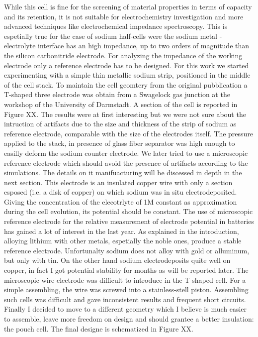 While this cell is fine for the screening of material properties in terms of capacity and its retention, it is not suitable for electrochemistry investigation and more advanced techniques like electrochemical impedance spectroscopy. This is espetially true for the case of sodium half-cells were the sodium metal -  electrolyte interface has an high impedance, up to two orders of magnitude than the silicon carbonitride electrode. For analyzing the impedance of the working electrode only a reference electrode has to be designed. For this work we started experimenting with a simple thin metallic sodium strip, positioned in the middle of the cell stack. To maintain the cell geomtery from the original pubblication a T-shaped three electrode was obtain from a Swagelock gas junction at the workshop of the University of Darmstadt. A section of the cell is reported in Figure XX. The results were at first interesting but we were not sure about the intruction of artifacts due to the size and thickness of the strip of sodium as reference electrode, comparable with the size of the electrodes itself. The pressure applied to the stack, in presence of glass fiber separator was high enough to easilly deform the sodium counter electrode. We later tried to use a microscopic reference electrode which should avoid the presence of artifacts according to the simulations. The details on it manifuacturing will be discessed in depth in the next section. This electrode is an insulated copper wire with only a section esposed (i.e. a disk of copper) on which sodium was in situ electrodeposited. Giving the concentration of the elecotrlyte of 1M constant as approximation during the cell evolution, its potential should be constant. The use of microscopic reference electrode for the relative measurement of electrode potential in batteries has gained a lot of interest in the last year. As explained in the introduction, alloying lithium with other metals, espetially the noble ones, produce a stable reference electrode. Unfortunalty sodium does not alloy with gold or alluminum, but only with tin. On the other hand sodium electrodeposits quite well on copper, in fact I got potential stability for months as will be reported later. The microscopic wire electrode was difficult to introduce in the T-shaped cell. For a simple assembling, the wire was screwed into a stainless-stell piston. Assembling such cells was difficult and gave inconsistent results and frequent short circuits. Finally I decided to move to a different geometry which I believe is much easier to assemble, leave more freedom on design and should grantee a better insulation: the pouch cell. The final designe is schematized in Figure XX.

